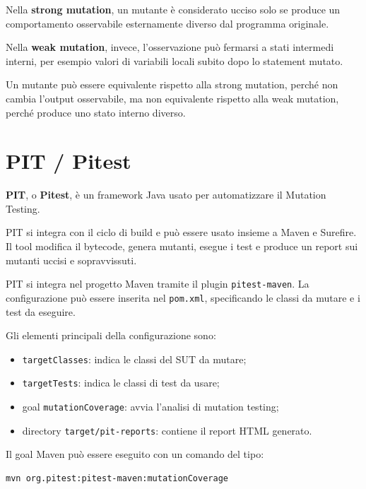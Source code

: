 Nella \textbf{strong mutation}, un mutante è considerato ucciso solo se produce un comportamento osservabile esternamente diverso dal programma originale.

Nella \textbf{weak mutation}, invece, l'osservazione può fermarsi a stati intermedi interni, per esempio valori di variabili locali subito dopo lo statement mutato.

\begin{notaesame}
Un mutante può essere equivalente rispetto alla strong mutation, perché non cambia l'output osservabile, ma non equivalente rispetto alla weak mutation, perché produce uno stato interno diverso.
\end{notaesame}

\section{PIT / Pitest}

\textbf{PIT}, o \textbf{Pitest}, è un framework Java usato per automatizzare il Mutation Testing.

PIT si integra con il ciclo di build e può essere usato insieme a Maven e Surefire. Il tool modifica il bytecode, genera mutanti, esegue i test e produce un report sui mutanti uccisi e sopravvissuti.

\begin{notaslide}
PIT si integra nel progetto Maven tramite il plugin \texttt{pitest-maven}. La configurazione può essere inserita nel \texttt{pom.xml}, specificando le classi da mutare e i test da eseguire.
\end{notaslide}

Gli elementi principali della configurazione sono:

\begin{itemize}
    \item \texttt{targetClasses}: indica le classi del SUT da mutare;
    \item \texttt{targetTests}: indica le classi di test da usare;
    \item goal \texttt{mutationCoverage}: avvia l'analisi di mutation testing;
    \item directory \texttt{target/pit-reports}: contiene il report HTML generato.
\end{itemize}

Il goal Maven può essere eseguito con un comando del tipo:

\begin{verbatim}
mvn org.pitest:pitest-maven:mutationCoverage
\end{verbatim}

